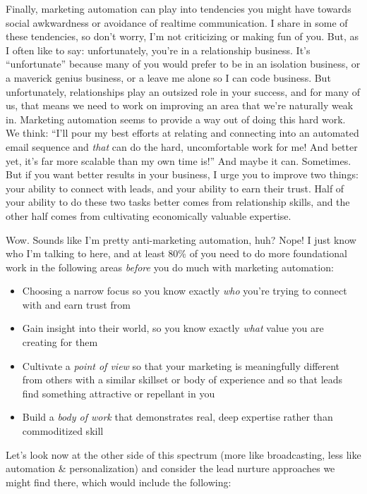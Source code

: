 Finally, marketing automation can play into tendencies you might have towards social awkwardness or avoidance of realtime communication. I share in some of these tendencies, so don't worry, I'm not criticizing or making fun of you. But, as I often like to say: unfortunately, you're in a relationship business. It's ``unfortunate'' because many of you would prefer to be in an isolation business, or a maverick genius business, or a leave me alone so I can code business. But unfortunately, relationships play an outsized role in your success, and for many of us, that means we need to work on improving an area that we're naturally weak in. Marketing automation seems to provide a way out of doing this hard work. We think: ``I'll pour my best efforts at relating and connecting into an automated email sequence and \emph{that} can do the hard, uncomfortable work for me! And better yet, it's far more scalable than my own time is!'' And maybe it can. Sometimes. But if you want better results in your business, I urge you to improve two things: your ability to connect with leads, and your ability to earn their trust. Half of your ability to do these two tasks better comes from relationship skills, and the other half comes from cultivating economically valuable expertise.

Wow. Sounds like I'm pretty anti-marketing automation, huh? Nope! I just know who I'm talking to here, and at least 80\% of you need to do more foundational work in the following areas \emph{before} you do much with marketing automation:

\begin{itemize}
\item Choosing a narrow focus so you know exactly \emph{who} you're trying to connect with and earn trust from
\item Gain insight into their world, so you know exactly \emph{what} value you are creating for them
\item Cultivate a \emph{point of view} so that your marketing is meaningfully different from others with a similar skillset or body of experience and so that leads find something attractive or repellant in you
\item Build a \emph{body of work} that demonstrates real, deep expertise rather than commoditized skill
\end{itemize}

Let's look now at the other side of this spectrum (more like broadcasting, less like automation \& personalization) and consider the lead nurture approaches we might find there, which would include the following:

